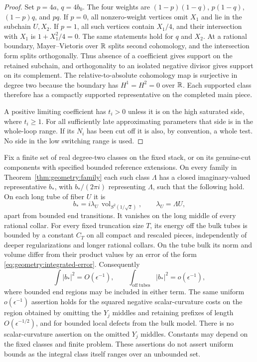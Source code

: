 \begin{proof}
Set $p=4a$, $q=4b_0$.  The four weights are
$(1-p)(1-q)$, $p(1-q)$, $(1-p)q$, and $pq$.
If $p=0$, all nonzero-weight vertices omit $X_1$ and lie
in the subchain $U,X_2$.  If $p=1$, all such vertices
contain $X_1/4$, and their intersection with $X_1$ is
$1+X_1^2/4=0$.  The same statements hold for $q$ and
$X_2$.  At a rational boundary, Mayer--Vietoris over
$\mathbb R$ splits second cohomology, and the intersection
form splits orthogonally.  Thus absence of a coefficient
gives support on the retained subchain, and orthogonality
to an isolated negative divisor gives support on its
complement.  The relative-to-absolute cohomology map is
surjective in degree two because the boundary has
$H^1=H^2=0$ over $\mathbb R$.  Each supported class therefore
has a compactly supported representative on the completed
main piece.

A positive limiting coefficient has $t_i>0$ unless it
is on the high saturated side, where $t_i\ge1$.
For all sufficiently late approximating parameters
that side is in the whole-loop range.  If its $N_i$
has been cut off it is also, by convention, a whole
test.  No side in the low switching range is used.
\end{proof}

\begin{lemma}
\label{lem:geometry:comparison}
Fix a finite set of real degree-two classes on the fixed
stack, or on its genuine-cut components with specified
bounded reference extensions.  On every family in
Theorem~\ref{thm:geometry:family} each such class $\Lambda$
has a closed imaginary-valued representative $b_*$, with
$b_*/(2\pi i)$ representing $\Lambda$, such that the
following hold.  On each long tube of fiber $U$ it is
\begin{equation}
 b_*=i\lambda_U\,\operatorname{vol}_{S^2(1/\sqrt2)},
 \qquad \lambda_U=\Lambda U,
 \label{eq:geometry:comparison-flux}
\end{equation}
apart from bounded end transitions.  It vanishes on the
long middle of every rational collar.  For every fixed
truncation size $T$, its energy off the bulk tubes is
bounded by a constant $C_T$ on all compact and rescaled
pieces, independently of deeper regularizations and
longer rational collars.  On the tube bulk its norm and
volume differ from their product values by an error of
the form \eqref{eq:geometry:integrated-error}.  Consequently
\begin{equation}
 \int |b_*|^2=O(\epsilon^{-1}),\qquad
 \int_{\mathrm{off\ tubes}}|b_*|^2=o(\epsilon^{-1}),
 \label{eq:geometry:comparison-energy}
\end{equation}
where bounded end regions may be included in either
term.  The same uniform $o(\epsilon^{-1})$ assertion
holds for the squared negative scalar-curvature costs
on the region obtained by omitting the $Y_j$ middles
and retaining prefixes of length $O(\epsilon^{-1/2})$,
and for bounded local defects from the bulk model.
There is no scalar-curvature assertion on the omitted
$Y_j$ middles.  Constants may depend on
the fixed classes and finite problem.  These assertions
do not assert uniform bounds as the integral class
itself ranges over an unbounded set.
\end{lemma}

